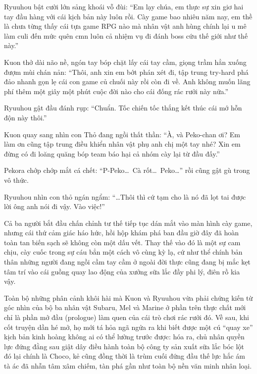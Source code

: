 \documentclass[../main.tex]{subfiles}
\begin{document}
\il

Ryuuhou bật cười lớn sảng khoái vỗ đùi: ``Em lạy chúa, em thực sự xin giơ hai tay đầu hàng với cái kịch bản này luôn rồi. Cày game bao nhiêu năm nay, em thề là chưa từng thấy cái tựa game RPG nào mà nhân vật anh hùng chính lại u mê làm culi đến mức quên cmn luôn cả nhiệm vụ đi đánh boss cứu thế giới như thế này.''

Kuon thở dài não nề, ngón tay bóp chặt lấy cái tay cầm, giọng trầm hẳn xuống đượm mùi chán nản: ``Thôi, anh xin em bớt phán xét đi, tập trung try-hard phá đảo nhanh gọn lẹ cái con game củ chuối này rồi còn đi về. Anh không muốn lãng phí thêm một giây một phút cuộc đời nào cho cái đống rác rưởi này nữa.''

Ryuuhou gật đầu đánh rụp: ``Chuẩn. Tốc chiến tốc thắng kết thúc cái mớ hỗn độn này thôi.''

Kuon quay sang nhìn con Thỏ đang ngồi thất thần: ``À, và Peko-chan ơi? Em làm ơn cũng tập trung điều khiển nhân vật phụ anh chị một tay nhé? Xin em đừng có đi loăng quăng bóp team báo hại cả nhóm cày lại từ đầu đấy.''

Pekora chớp chớp mắt cá chết: ``P-Peko\dots\ Cà rốt\dots\ Peko\dots'' rồi cũng gật gù trong vô thức.

Ryuuhou nhìn con thỏ ngán ngẩm: ``\dots Thôi thì cứ tạm cho là nó đã lọt tai được lời ông anh nói đi vậy. Vào việc!''

\il

Cả ba người bắt đầu chấn chỉnh tư thế tiếp tục dán mắt vào màn hình cày game, nhưng cái thứ cảm giác háo hức, hồi hộp khám phá ban đầu giờ đây đã hoàn toàn tan biến sạch sẽ không còn một dấu vết. Thay thế vào đó là một sự cam chịu, cày cuốc trong sự cáu bẳn một cách vô cùng kỳ lạ, cứ như thể chính bản thân những người đang ngồi cầm tay cầm ở ngoài đời thực cũng đang bị mắc kẹt tâm trí vào cái guồng quay lao động của xưởng sữa lắc đầy phi lý, điên rồ kia vậy.

\omk

Toàn bộ những phân cảnh khôi hài mà Kuon và Ryuuhou vừa phải chứng kiến từ góc nhìn của bộ ba nhân vật Subaru, Mel và Marine ở phần trên thực chất mới chỉ là phần mở đầu (prologue) làm quen của cái trò chơi rác rưởi đó. Về sau, khi cốt truyện dần hé mở, họ mới tá hỏa ngã ngửa ra khi biết được một cú ``quay xe'' kịch bản kinh hoàng không ai có thể lường trước được: hóa ra, chủ nhân quyền lực đứng đằng sau giật dây điều hành toàn bộ công ty sản xuất sữa lắc bóc lột đó lại chính là Choco, kẻ cũng đồng thời là trùm cuối đứng đầu thế lực hắc ám tà ác đã nhẫn tâm xâm chiếm, tàn phá gần như toàn bộ nền văn minh nhân loại.
\end{document}
